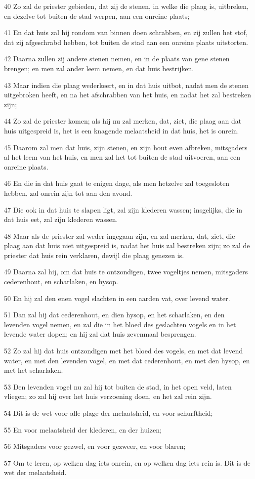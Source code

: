 \par 40 Zo zal de priester gebieden, dat zij de stenen, in welke die plaag is, uitbreken, en dezelve tot buiten de stad werpen, aan een onreine plaats;
\par 41 En dat huis zal hij rondom van binnen doen schrabben, en zij zullen het stof, dat zij afgeschrabd hebben, tot buiten de stad aan een onreine plaats uitstorten.
\par 42 Daarna zullen zij andere stenen nemen, en in de plaats van gene stenen brengen; en men zal ander leem nemen, en dat huis bestrijken.
\par 43 Maar indien die plaag wederkeert, en in dat huis uitbot, nadat men de stenen uitgebroken heeft, en na het afschrabben van het huis, en nadat het zal bestreken zijn;
\par 44 Zo zal de priester komen; als hij nu zal merken, dat, ziet, die plaag aan dat huis uitgespreid is, het is een knagende melaatsheid in dat huis, het is onrein.
\par 45 Daarom zal men dat huis, zijn stenen, en zijn hout even afbreken, mitsgaders al het leem van het huis, en men zal het tot buiten de stad uitvoeren, aan een onreine plaats.
\par 46 En die in dat huis gaat te enigen dage, als men hetzelve zal toegesloten hebben, zal onrein zijn tot aan den avond.
\par 47 Die ook in dat huis te slapen ligt, zal zijn klederen wassen; insgelijks, die in dat huis eet, zal zijn klederen wassen.
\par 48 Maar als de priester zal weder ingegaan zijn, en zal merken, dat, ziet, die plaag aan dat huis niet uitgespreid is, nadat het huis zal bestreken zijn; zo zal de priester dat huis rein verklaren, dewijl die plaag genezen is.
\par 49 Daarna zal hij, om dat huis te ontzondigen, twee vogeltjes nemen, mitsgaders cederenhout, en scharlaken, en hysop.
\par 50 En hij zal den enen vogel slachten in een aarden vat, over levend water.
\par 51 Dan zal hij dat cederenhout, en dien hysop, en het scharlaken, en den levenden vogel nemen, en zal die in het bloed des geslachten vogels en in het levende water dopen; en hij zal dat huis zevenmaal besprengen.
\par 52 Zo zal hij dat huis ontzondigen met het bloed des vogels, en met dat levend water, en met den levenden vogel, en met dat cederenhout, en met den hysop, en met het scharlaken.
\par 53 Den levenden vogel nu zal hij tot buiten de stad, in het open veld, laten vliegen; zo zal hij over het huis verzoening doen, en het zal rein zijn.
\par 54 Dit is de wet voor alle plage der melaatsheid, en voor schurftheid;
\par 55 En voor melaatsheid der klederen, en der huizen;
\par 56 Mitsgaders voor gezwel, en voor gezweer, en voor blaren;
\par 57 Om te leren, op welken dag iets onrein, en op welken dag iets rein is. Dit is de wet der melaatsheid.

